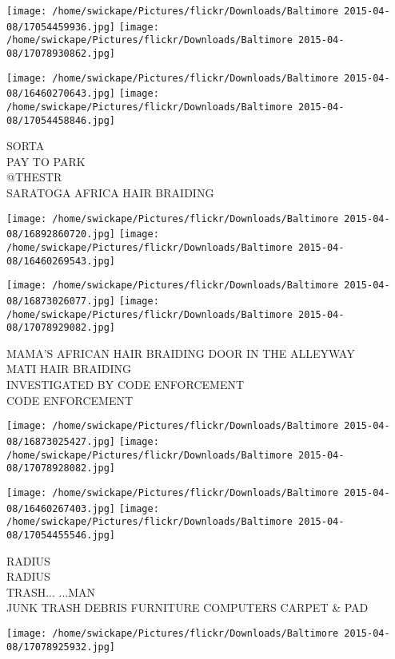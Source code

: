 \documentclass[10pt,letterpaper]{article}
\begin{document}
\texttt{[image: /home/swickape/Pictures/flickr/Downloads/Baltimore 2015-04-08/17054459936.jpg]}
\texttt{[image: /home/swickape/Pictures/flickr/Downloads/Baltimore 2015-04-08/17078930862.jpg]}

\texttt{[image: /home/swickape/Pictures/flickr/Downloads/Baltimore 2015-04-08/16460270643.jpg]}
\texttt{[image: /home/swickape/Pictures/flickr/Downloads/Baltimore 2015-04-08/17054458846.jpg]}

SORTA\\
PAY TO PARK\\
@THESTR\\
SARATOGA AFRICA HAIR BRAIDING\\
\pagebreak

\texttt{[image: /home/swickape/Pictures/flickr/Downloads/Baltimore 2015-04-08/16892860720.jpg]}
\texttt{[image: /home/swickape/Pictures/flickr/Downloads/Baltimore 2015-04-08/16460269543.jpg]}

\texttt{[image: /home/swickape/Pictures/flickr/Downloads/Baltimore 2015-04-08/16873026077.jpg]}
\texttt{[image: /home/swickape/Pictures/flickr/Downloads/Baltimore 2015-04-08/17078929082.jpg]}

MAMA'S AFRICAN HAIR BRAIDING DOOR IN THE ALLEYWAY\\
MATI HAIR BRAIDING\\
INVESTIGATED BY CODE ENFORCEMENT\\
CODE ENFORCEMENT\\
\pagebreak

\texttt{[image: /home/swickape/Pictures/flickr/Downloads/Baltimore 2015-04-08/16873025427.jpg]}
\texttt{[image: /home/swickape/Pictures/flickr/Downloads/Baltimore 2015-04-08/17078928082.jpg]}

\texttt{[image: /home/swickape/Pictures/flickr/Downloads/Baltimore 2015-04-08/16460267403.jpg]}
\texttt{[image: /home/swickape/Pictures/flickr/Downloads/Baltimore 2015-04-08/17054455546.jpg]}

RADIUS\\
RADIUS\\
TRASH... ...MAN\\
JUNK TRASH DEBRIS FURNITURE COMPUTERS CARPET \& PAD\\
\pagebreak

\texttt{[image: /home/swickape/Pictures/flickr/Downloads/Baltimore 2015-04-08/17078925932.jpg]}
\end{document}
